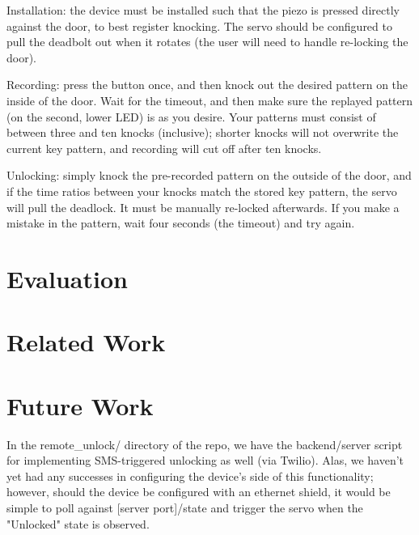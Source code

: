 \documentclass[11pt]{article}			%
\begin{document}
Installation: the device must be installed such that the piezo is pressed directly against the door, to best register knocking. The servo should be configured to pull the deadbolt out when it rotates (the user will need to handle re-locking the door).

Recording: press the button once, and then knock out the desired pattern on the inside of the door. Wait for the timeout, and then make sure the replayed pattern (on the second, lower LED) is as you desire. Your patterns must consist of between three and ten knocks (inclusive); shorter knocks will not overwrite the current key pattern, and recording will cut off after ten knocks.

Unlocking: simply knock the pre-recorded pattern on the outside of the door, and if the time ratios between your knocks match the stored key pattern, the servo will pull the deadlock. It must be manually re-locked afterwards. If you make a mistake in the pattern, wait four seconds (the timeout) and try again.

\section{Evaluation}

\section{Related Work}

\section{Future Work}

In the remote\_unlock/ directory of the repo, we have the backend/server script for implementing SMS-triggered unlocking as well (via Twilio). Alas, we haven't yet had any successes in configuring the device's side of this functionality; however, should the device be configured with an ethernet shield, it would be simple to poll against [server port]/state and trigger the servo when the "Unlocked" state is observed.
\end{document}
